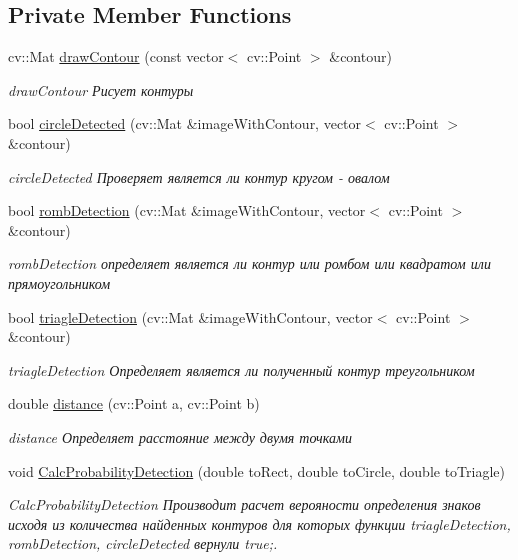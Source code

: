 \subsection*{Private Member Functions}
\begin{DoxyCompactItemize}
\item 
cv\+::\+Mat \hyperlink{class_contour_analis_a8dfbcc0a15123202d1af035f7206d87c}{draw\+Contour} (const vector$<$ cv\+::\+Point $>$ \&contour)
\begin{DoxyCompactList}\small\item\em draw\+Contour Рисует контуры \end{DoxyCompactList}\item 
bool \hyperlink{class_contour_analis_a2e67419653bf28f2bbf6766e2ffa1089}{circle\+Detected} (cv\+::\+Mat \&image\+With\+Contour, vector$<$ cv\+::\+Point $>$ \&contour)
\begin{DoxyCompactList}\small\item\em circle\+Detected Проверяет является ли контур кругом -\/ овалом \end{DoxyCompactList}\item 
bool \hyperlink{class_contour_analis_a1970e01e1762c299753c0d57f0879915}{romb\+Detection} (cv\+::\+Mat \&image\+With\+Contour, vector$<$ cv\+::\+Point $>$ \&contour)
\begin{DoxyCompactList}\small\item\em romb\+Detection определяет является ли контур или ромбом или квадратом или прямоугольником \end{DoxyCompactList}\item 
bool \hyperlink{class_contour_analis_a5c8b79c28a07825f5413cd98640d8dd2}{triagle\+Detection} (cv\+::\+Mat \&image\+With\+Contour, vector$<$ cv\+::\+Point $>$ \&contour)
\begin{DoxyCompactList}\small\item\em triagle\+Detection Определяет является ли полученный контур треугольником \end{DoxyCompactList}\item 
double \hyperlink{class_contour_analis_a4f99f88069c6a746805275d21acdf5b2}{distance} (cv\+::\+Point a, cv\+::\+Point b)
\begin{DoxyCompactList}\small\item\em distance Определяет расстояние между двумя точками \end{DoxyCompactList}\item 
void \hyperlink{class_contour_analis_a1a8b2ccb473a901f51cc21339c16c3ea}{Calc\+Probability\+Detection} (double to\+Rect, double to\+Circle, double to\+Triagle)
\begin{DoxyCompactList}\small\item\em Calc\+Probability\+Detection Производит расчет верояности определения знаков исходя из количества найденных контуров для которых функции triagle\+Detection, romb\+Detection, circle\+Detected вернули true;. \end{DoxyCompactList}\end{DoxyCompactItemize}


